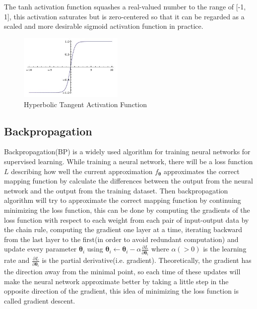\begin{itemize}
    The tanh activation function squashes a real-valued number to the range of [-1, 1], this activation
    saturates but is zero-centered so that it can be regarded as a scaled and more desirable sigmoid 
    activation function in practice.
    \begin{figure}[H]
        \begin{center}
        \includegraphics[width=5cm]{figures/tanh}
        \end{center}
        \caption{Hyperbolic Tangent Activation Function}
        \label{fig:tanh}
    \end{figure}
    
\end{itemize}

\subsection{Backpropagation}
Backpropagation(BP) is a widely used algorithm for training neural networks for
supervised learning. While training a neural network, there will be a loss function
$L$ describing how well the current approximation $f_{\boldsymbol{\theta}}$ approximates
the correct mapping function by calculate the differences between the output from the 
neural network and the output from the training dataset. Then backpropagation algorithm 
will try to approximate the correct mapping function by continuing minimizing the loss function, 
this can be done by computing the gradients of the loss function with respect to 
each weight from each pair of input-output data by the chain rule, 
computing the gradient one layer at a time, iterating backward from the last layer to 
the first(in order to avoid redundant computation) and update every parameter 
${\boldsymbol{\theta}_{i}}$ using 
$\boldsymbol{\theta}_{i} \leftarrow \boldsymbol{\theta}_{i}-\alpha \frac{\partial L}{\partial \boldsymbol{\theta}_{i}}$
where $\alpha(>0)$ is the learning rate and $\frac{\partial L}{\partial \boldsymbol{\theta}_{i}}$ is the partial
derivative(i.e. gradient). Theoretically, the gradient has the direction away from the minimal point, 
so each time of these updates will make the neural network 
approximate better by taking a little step in the opposite direction of the gradient, this idea 
of minimizing the loss function is called gradient descent.

